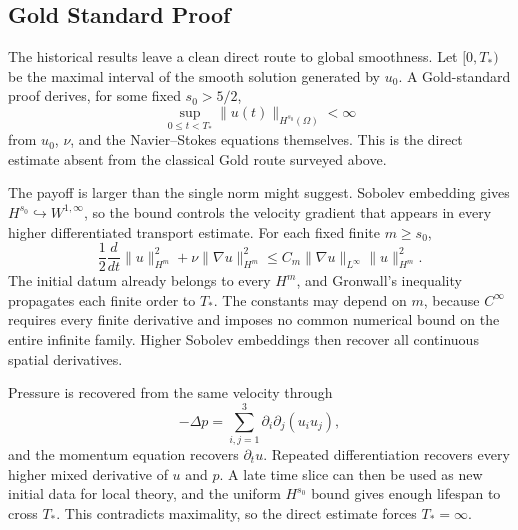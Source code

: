 \subsection{Gold Standard Proof}\label{sub:GoldStandardProof}

The historical results leave a clean direct route to global smoothness.
Let \([0,T_*)\) be the maximal interval of the smooth solution generated by \(u_0\).
A Gold-standard proof derives, for some fixed \(s_0>5/2\),
\[
  \sup_{0\leq t<T_*}
  \lVert u(t)\rVert_{H^{s_0}(\Omega)}
  <
  \infty
\]
from \(u_0\), \(\nu\), and the Navier--Stokes equations themselves.
This is the direct estimate absent from the classical Gold route surveyed above.

The payoff is larger than the single norm might suggest.
Sobolev embedding gives \(H^{s_0}\hookrightarrow W^{1,\infty}\), so the bound controls the velocity gradient that appears in every higher differentiated transport estimate.
For each fixed finite \(m\geq s_0\),
\[
  \frac12\frac{d}{dt}\lVert u\rVert_{H^m}^{2}
  +\nu\lVert\nabla u\rVert_{H^m}^{2}
  \leq
  C_m\lVert\nabla u\rVert_{L^\infty}\lVert u\rVert_{H^m}^{2}.
\]
The initial datum already belongs to every \(H^m\), and Gronwall's inequality propagates each finite order to \(T_*\).
The constants may depend on \(m\), because \(C^\infty\) requires every finite derivative and imposes no common numerical bound on the entire infinite family.
Higher Sobolev embeddings then recover all continuous spatial derivatives.

Pressure is recovered from the same velocity through
\[
  -\Delta p
  =
  \sum_{i,j=1}^{3}\partial_i\partial_j(u_i u_j),
\]
and the momentum equation recovers \(\partial_tu\).
Repeated differentiation recovers every higher mixed derivative of \(u\) and \(p\).
A late time slice can then be used as new initial data for local theory, and the uniform \(H^{s_0}\) bound gives enough lifespan to cross \(T_*\).
This contradicts maximality, so the direct estimate forces \(T_*=\infty\).

